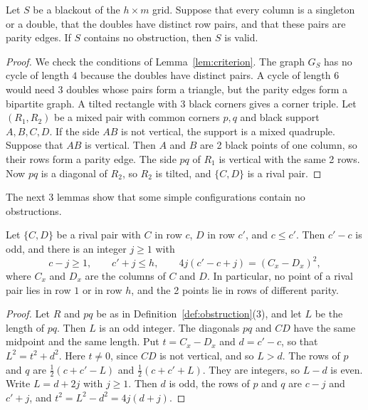 \begin{lemma}[reduction]\label{lem:reduction}
Let $S$ be a blackout of the $h\times m$ grid. Suppose that every column is a singleton or a
double, that the doubles have distinct row pairs, and that these pairs are parity edges. If
$S$ contains no obstruction, then $S$ is valid.
\end{lemma}

\begin{proof}
We check the conditions of Lemma~\ref{lem:criterion}. The graph $G_S$ has no cycle of length
$4$ because the doubles have distinct pairs. A cycle of length $6$ would need 3 doubles
whose pairs form a triangle, but the parity edges form a bipartite graph. A tilted
rectangle with 3 black corners gives a corner triple. Let $(R_1,R_2)$ be a mixed pair with
common corners $p,q$ and black support $A,B,C,D$. If the side $AB$ is not vertical, the
support is a mixed quadruple. Suppose that $AB$ is vertical. Then $A$ and $B$ are 2 black
points of one column, so their rows form a parity edge. The side $pq$ of $R_1$ is vertical
with the same 2 rows. Now $pq$ is a diagonal of $R_2$, so $R_2$ is tilted, and $\{C,D\}$ is
a rival pair.
\end{proof}

The next 3 lemmas show that some simple configurations contain no obstructions.

\begin{lemma}\label{lem:rival}
Let $\{C,D\}$ be a rival pair with $C$ in row $c$, $D$ in row $c'$, and $c\le c'$. Then
$c'-c$ is odd, and there is an integer $j\ge1$ with
\[
 c-j\ge1,\qquad c'+j\le h,\qquad 4j(c'-c+j)=(C_x-D_x)^2 ,
\]
where $C_x$ and $D_x$ are the columns of $C$ and $D$. In particular, no point of a rival
pair lies in row $1$ or in row $h$, and the 2 points lie in rows of different parity.
\end{lemma}

\begin{proof}
Let $R$ and $pq$ be as in Definition~\ref{def:obstruction}(3), and let $L$ be the length of
$pq$. Then $L$ is an odd integer. The diagonals $pq$ and $CD$ have the same midpoint and the
same length. Put $t=C_x-D_x$ and $d=c'-c$, so that $L^2=t^2+d^2$. Here $t\ne0$, since $CD$
is not vertical, and so $L>d$. The rows of $p$ and $q$ are $\frac12(c+c'-L)$ and
$\frac12(c+c'+L)$. They are integers, so $L-d$ is even. Write $L=d+2j$ with $j\ge1$. Then
$d$ is odd, the rows of $p$ and $q$ are $c-j$ and $c'+j$, and
$t^2=L^2-d^2=4j(d+j)$.
\end{proof}

